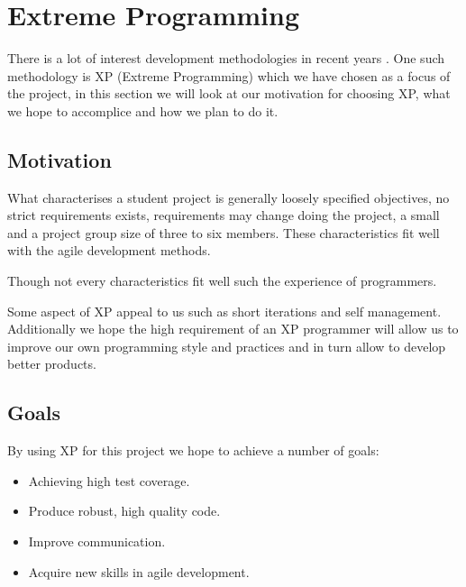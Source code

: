 \section{Extreme Programming}
There is a lot of interest development methodologies in recent years . One such methodology is XP (Extreme Programming) which we have chosen as a focus of the project, in this section we will look at our motivation for choosing XP, what we hope to accomplice and how we plan to do it.
	
\subsection{Motivation}
What characterises a student project is generally loosely specified objectives, no strict requirements exists, requirements may change doing the project, a small and a project group size of three to six members. These characteristics fit well with the agile development methods. 

Though not every characteristics fit well such the experience of programmers.

Some aspect of XP appeal to us such as short iterations and self management. Additionally we hope the high requirement of an XP programmer will allow us to improve our own programming style and practices and in turn allow to develop better products.

\subsection{Goals}
By using XP for this project we hope to achieve a number of goals:
\begin{itemize}
\item Achieving high test coverage.
\item Produce robust, high quality code.
\item Improve communication.
\item Acquire new skills in agile development.
\end{itemize}

